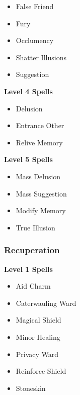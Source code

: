 \begin{multicols}{4}
\begin{itemize}[itemsep=0em]
\item False Friend

\item Fury

\item Occlumency

\item Shatter Illusions

\item Suggestion


\end{itemize}
\textbf{Level 4 Spells}
\begin{itemize}[itemsep=0em]
\renewcommand\labelitemi{-}
\item Delusion

\item Entrance Other

\item Relive Memory


\end{itemize}
\textbf{Level 5 Spells}
\begin{itemize}[itemsep=0em]
\renewcommand\labelitemi{-}
\item Mass Delusion

\item Mass Suggestion

\item Modify Memory

\item True Illusion


\end{itemize}
\vfill\null
\columnbreak\subsubsection{Recuperation}
\textbf{Level 1 Spells}
\begin{itemize}[itemsep=0em]
\renewcommand\labelitemi{-}
\item Aid Charm

\item Caterwauling Ward

\item Magical Shield

\item Minor Healing

\item Privacy Ward

\item Reinforce Shield

\item Stoneskin


\end{itemize}
\end{multicols}
